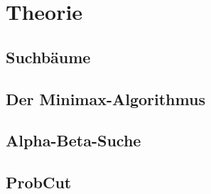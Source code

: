 
\chapter{Theorie}

\section{Suchbäume}

\section{Der Minimax-Algorithmus}

\section{Alpha-Beta-Suche}

\section{ProbCut}
